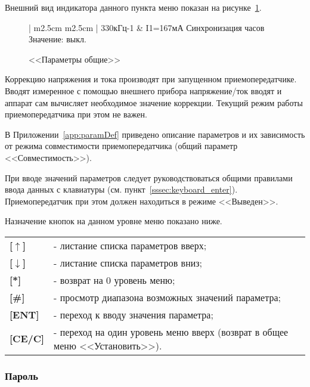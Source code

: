 Внешний вид индикатора данного пункта меню показан на рисунке~\ref{fig:setup_param_glb}.
 
\begin{figure}[H]
	\centering
	
	\begin{tabular}{| m{2.5cm}  m{2.5cm} |}
		\firsthline
		330кГц-1	& \raggedleft I1=167мА		\tabularnewline 
		 {Синхронизация часов}	\tabularnewline
		 {Значение: выкл.} 	\tabularnewline 
		 {}					\tabularnewline 
		\lasthline
	\end{tabular} 
	
	\caption{<<Параметры общие>>}
	\label{fig:setup_param_glb}
\end{figure}

Коррекцию напряжения и тока производят при запущенном приемопередатчике. Вводят измеренное с помощью внешнего прибора напряжение/ток вводят и аппарат сам вычисляет необходимое значение коррекции. Текущий режим работы приемопередатчика при этом не важен.

В Приложении~\ref{app:paramDef} приведено описание параметров и их зависимость от режима совместимости приемопередатчика (общий параметр <<Совместимость>>).

При вводе значений параметров следует руководствоваться общими правилами ввода данных с клавиатуры (см. пункт~\ref{sssec:keyboard_enter}). Приемопередатчик при этом должен находиться в режиме <<Выведен>>.

Назначение кнопок на данном уровне меню показано ниже.
\begin{center}
	\begin{tabular}{p{2cm} p{15cm}}
		\textbf{[$\uparrow$]}  	& - листание списка параметров вверх; \tabularnewline
		\textbf{[$\downarrow$]} & - листание списка параметров вниз; \tabularnewline
		\textbf{[*]} 			& - возврат на 0 уровень меню; \tabularnewline
		\textbf{[\#]} 			& - просмотр диапазона возможных значений параметра; \tabularnewline
		\textbf{[ENT]} 			& - переход к вводу значения параметра; \tabularnewline
		\textbf{[CE/C]} 		& - переход на один уровень меню вверх (возврат в общее меню <<Установить>>). \tabularnewline				
	\end{tabular}
\end{center} 


\subsubsection{Пароль}

